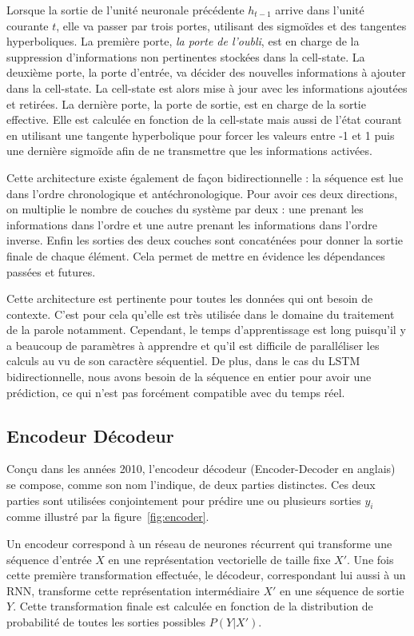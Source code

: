 Lorsque la sortie de l'unité neuronale précédente $h_{t-1}$ arrive dans l'unité courante $t$, elle va passer par trois portes, utilisant des sigmoïdes et des tangentes hyperboliques. La première porte, \textit{la porte de l'oubli}, est en charge de la suppression d'informations non pertinentes stockées dans la cell-state. La deuxième porte, la porte d'entrée, va décider des nouvelles informations à ajouter dans la cell-state. La cell-state est alors mise à jour avec les informations ajoutées et retirées. La dernière porte, la porte de sortie, est en charge de la sortie effective. Elle est calculée en fonction de la cell-state mais aussi de l'état courant en utilisant une tangente hyperbolique pour forcer les valeurs entre -1 et 1 puis une dernière sigmoïde afin de ne transmettre que les informations activées.

Cette architecture existe également de façon bidirectionnelle : la séquence est lue dans l'ordre chronologique  et antéchronologique. Pour avoir ces deux directions, on multiplie le nombre de couches du système par deux : une prenant les informations dans l'ordre et une autre prenant les informations dans l'ordre inverse. Enfin les sorties des deux couches sont concaténées pour donner la sortie finale de chaque élément. Cela permet de mettre en évidence les dépendances passées et futures.

Cette architecture est pertinente pour toutes les données qui ont besoin de contexte. C'est pour cela qu'elle est très utilisée dans le domaine du traitement de la parole notamment. Cependant, le temps d'apprentissage est long puisqu'il y a beaucoup de paramètres à apprendre et qu'il est difficile de paralléliser les calculs au vu de son caractère séquentiel. De plus, dans le cas du LSTM bidirectionnelle, nous avons besoin de la séquence en entier pour avoir une prédiction, ce qui n'est pas forcément compatible avec du temps réel.

\subsection{Encodeur Décodeur}


Conçu dans les années 2010, l'encodeur décodeur (Encoder-Decoder en anglais)~\cite{Cho2014} se compose, comme son nom l'indique, de deux parties distinctes. Ces deux parties sont utilisées conjointement pour prédire une ou plusieurs sorties $y_i$ comme illustré par la figure~\ref{fig:encoder}.

Un encodeur correspond à un réseau de neurones récurrent qui transforme une séquence d'entrée $X$ en une représentation vectorielle de taille fixe $X'$. Une fois cette première transformation effectuée, le décodeur, correspondant lui aussi à un RNN, transforme cette représentation intermédiaire $X'$ en une séquence de sortie $Y$. Cette transformation finale est calculée en fonction de la distribution de probabilité de toutes les sorties possibles $P(Y|X')$.

